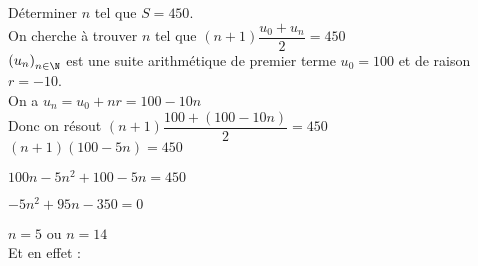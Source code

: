 Déterminer $n$ tel que $S = 450$. \\

On cherche à trouver $n$ tel que $\left(n+1\right)\dfrac{u_0 + u_n}{2} = 450$ \\

$\left(u_n\right)_{n \in \N}$ est une suite arithmétique de premier terme $u_0 = 100$ et de raison $r = -10$. \\

On a $u_n = u_0 + nr = 100 - 10n$ \\

Donc on résout $\left(n+1\right)\dfrac{100 + \left(100 -10n\right)}{2} = 450$ \\

$\left(n+1\right)\left(100 - 5n\right) = 450$ 

$100n -5n^2 + 100 - 5n = 450$ 

$-5n^2 + 95n - 350 = 0$ 

$ n = 5$ ou $n = 14$ \\

Et en effet : \\

